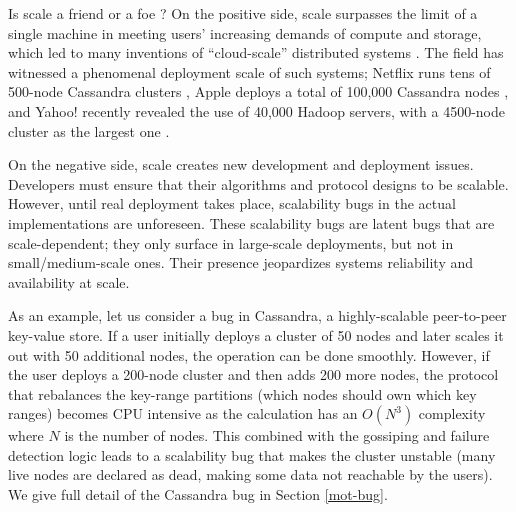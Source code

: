Is scale a friend or a foe \cite{Ousterhout+11-ScaleFriendEnemy}?
On the positive side, scale surpasses the limit of a single machine in
meeting users' increasing demands of compute and storage, which led to
many inventions of ``cloud-scale'' distributed systems
\cite{Chang+06-BigTable, 
DeanGhemawat04-MapReduce, 
DeCandia+07-Dynamo,
Ghemawat+03-GoogleFS, 
Hindman+11-Mesos,
Verma+15-Borg}.  The field has witnessed a
phenomenal deployment scale of such systems;
%
Netflix runs tens of 500-node Cassandra clusters \cite{RunningNetflix13},
Apple deploys a total of 100,000 Cassandra nodes \cite{WikiCassandra}, 
and Yahoo! recently revealed the use of 40,000 Hadoop servers,
with a 4500-node cluster as the largest one \cite{LargestHadoop}.

On the negative side, scale creates new development and deployment issues.
Developers must ensure that their algorithms and protocol designs
to be scalable.
However, until real deployment takes place, scalability bugs 
in the actual implementations are unforeseen.
These scalability bugs are latent bugs that
are scale-dependent; they only surface in large-scale deployments, but not
in small/medium-scale ones. Their presence jeopardizes systems
reliability and availability at scale.

As an example, let us consider a bug in Cassandra, a highly-scalable
peer-to-peer key-value store.  If a user initially deploys a cluster of 50 nodes
and later scales it out with 50 additional nodes, the operation can be done
smoothly. However, if the user deploys a 200-node cluster and then adds 200
more nodes, the protocol that rebalances the key-range partitions (which nodes
should own which key ranges) becomes CPU intensive as the calculation has an
$O(N^3)$ complexity where $N$ is the number of nodes.  This combined with the
gossiping and failure detection logic leads to a scalability bug that makes the
cluster unstable (many live nodes are declared as dead, making some data not
reachable by the users). We give full detail of the Cassandra bug in Section
\ref{mot-bug}.

